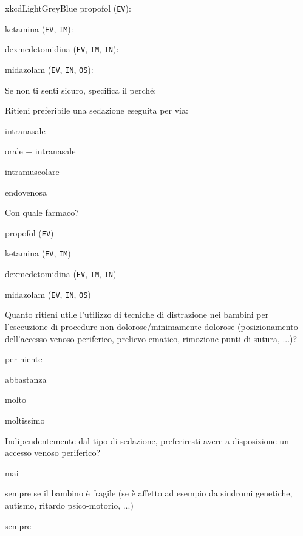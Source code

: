 \begin{survey}{xkcdLightGreyBlue}
           propofol (\texttt{EV}): \hfill {}
           
           ketamina (\texttt{EV}, \texttt{IM}): \hfill {}
           
           dexmedetomidina (\texttt{EV}, \texttt{IM}, \texttt{IN}): \hfill {}
           
           midazolam (\texttt{EV}, \texttt{IN}, \texttt{OS}): \hfill {}
    
       \Query Se non ti senti sicuro, specifica il perché:
       
       \Query Ritieni preferibile una sedazione eseguita per via:
       \begin{Qlist}
           \item intranasale
           \item orale + intranasale
           \item intramuscolare
           \item endovenosa
       \end{Qlist}
       
\newpage

       \Query Con quale farmaco?
        \begin{Qlist}
           \item propofol (\texttt{EV})
           \item ketamina (\texttt{EV}, \texttt{IM})
           \item dexmedetomidina (\texttt{EV}, \texttt{IM}, \texttt{IN})
           \item midazolam (\texttt{EV}, \texttt{IN}, \texttt{OS})
       \end{Qlist}
       
       \Query Quanto ritieni utile l’utilizzo di tecniche di distrazione nei bambini per l’esecuzione di procedure non dolorose/minimamente dolorose (posizionamento dell'accesso venoso periferico, prelievo ematico, rimozione punti di sutura, ...)?
       \begin{Qlist}
           \item per niente
           \item abbastanza
           \item molto
           \item moltissimo
       \end{Qlist}
       
       \Query Indipendentemente dal tipo di sedazione, preferiresti avere a disposizione un accesso venoso periferico?
       \begin{Qlist}
           \item mai
           \item sempre se il bambino è fragile (se è affetto ad esempio da sindromi genetiche, autismo, ritardo psico-motorio, ...)
           \item sempre
       \end{Qlist}
       

\end{survey}
